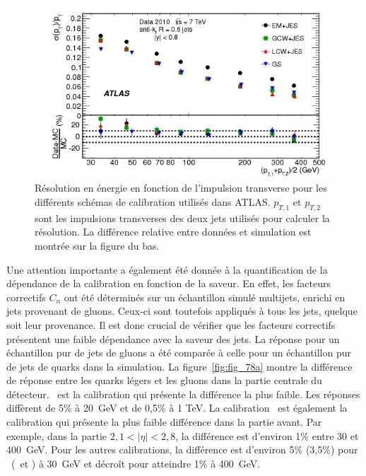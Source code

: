\begin{figure}[!h]
	\centering
	\includegraphics[scale=0.55]{figures/fig_13a.jpg}
	\caption{R\'esolution en \'energie en fonction de l'impulsion transverse pour les diff\'erents sch\'emas de calibration utilis\'es dans ATLAS. $p_{T,1}$ et $p_{T,2}$ sont les impulsions transverses des deux jets utilis\'es pour calculer la r\'esolution. La diff\'erence relative entre donn\'ees et simulation est montr\'ee sur la figure du bas.}
	\label{fig:fig_13a}
\end{figure}

Une attention importante a \'egalement \'et\'e donn\'ee \`a la quantification de la dépendance de la calibration en fonction de la saveur. En effet, les facteurs correctifs $C_n$ ont été déterminés sur un échantillon simulé multijets, enrichi en jets provenant de gluons. Ceux-ci sont toutefois appliqués à tous les jets, quelque soit leur provenance. Il est donc crucial de vérifier que les facteurs correctifs présentent une faible dépendance avec la saveur des jets. La réponse pour un échantillon pur de jets de gluons a \'et\'e comparée à celle pour un échantillon pur de jets de quarks dans la simulation. La figure~\ref{fig:fig_78a} montre la diff\'erence de r\'eponse entre les quarks l\'egers et les gluons dans la partie centrale du d\'etecteur. \GS~est la calibration qui pr\'esente la diff\'erence la plus faible. Les réponses diffèrent de 5\% à 20~GeV et de 0,5\% à 1 TeV. La calibration \GS~est \'egalement la calibration qui pr\'esente la plus faible diff\'erence dans la partie avant. Par exemple, dans la partie $2,1<|\eta|<2,8$, la diff\'erence est d'environ 1\% entre 30 et 400~GeV. Pour les autres calibrations, la diff\'erence est d'environ 5\% (3,5\%) pour \EMJES~(\LCW~et \GCW) \`a 30~GeV et d\'ecro\^it pour atteindre 1\% \`a 400~GeV.

